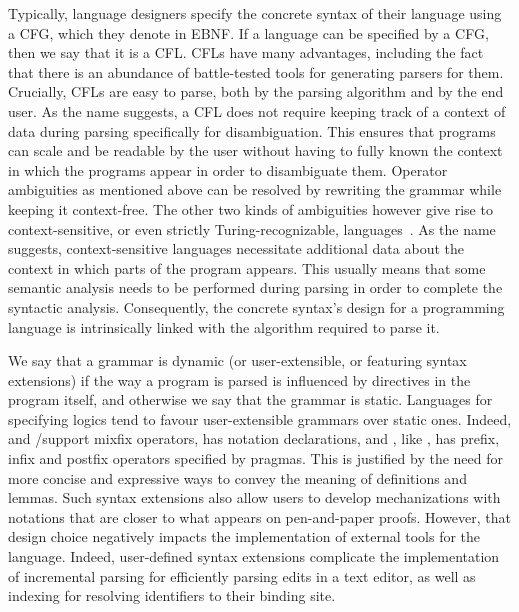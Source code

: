 
Typically, language designers specify the concrete syntax of their language using a \ac{CFG}, which they denote in \ac{EBNF}.
If a language can be specified by a \ac{CFG}, then we say that it is a \ac{CFL}.
\Acp{CFL} have many advantages, including the fact that there is an abundance of battle-tested tools for generating parsers for them.
Crucially, \acp{CFL} are easy to parse, both by the parsing algorithm and by the end user.
As the name suggests, a \ac{CFL} does not require keeping track of a context of data during parsing specifically for disambiguation.
This ensures that programs can scale and be readable by the user without having to fully known the context in which the programs appear in order to disambiguate them.
Operator ambiguities as mentioned above can be resolved by rewriting the grammar while keeping it context-free.
The other two kinds of ambiguities however give rise to context-sensitive, or even strictly Turing-recognizable, languages~\cite{chomsky1956three}.
As the name suggests, context-sensitive languages necessitate additional data about the context in which parts of the program appears.
This usually means that some semantic analysis needs to be performed during parsing in order to complete the syntactic analysis.
Consequently, the concrete syntax's design for a programming language is intrinsically linked with the algorithm required to parse it.


We say that a grammar is dynamic (or user-extensible, or featuring syntax extensions) if the way a program is parsed is influenced by directives in the program itself, and otherwise we say that the grammar is static.
Languages for specifying logics tend to favour user-extensible grammars over static ones.
Indeed, \Agda and \Isabelle/\HOL support mixfix operators, \Coq has notation declarations, and \Beluga, like \Twelf, has prefix, infix and postfix operators specified by pragmas.
This is justified by the need for more concise and expressive ways to convey the meaning of definitions and lemmas.
Such syntax extensions also allow users to develop mechanizations with notations that are closer to what appears on pen-and-paper proofs.
However, that design choice negatively impacts the implementation of external tools for the language.
Indeed, user-defined syntax extensions complicate the implementation of incremental parsing for efficiently parsing edits in a text editor, as well as indexing for resolving identifiers to their binding site.

